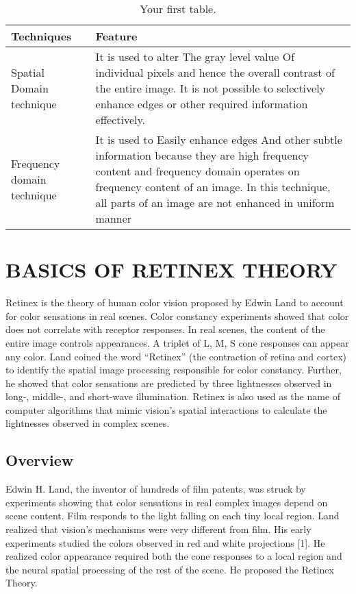 \begin{table}[h!]
	\begin{center}
	\caption{Your first table.}
    \label{tab:table1}
	\begin{tabular}{| m{5cm} | m{8cm}| }
	\hline
		\textbf{Techniques} & \textbf{Feature}\\
	\hline
		Spatial Domain technique & It is used to alter The gray level value Of individual pixels and hence the overall contrast of the entire image. It is not possible to selectively enhance edges or other required information effectively. \\
	\hline
		Frequency domain technique & It is used to Easily enhance edges And other subtle information because they are high frequency content and frequency domain operates on frequency content of an image. In this technique, all parts of  an  image  are  not enhanced in uniform manner \\ 
	
	\hline
	\end{tabular}
	\end{center}

\end{table}


\section{BASICS OF RETINEX THEORY}
Retinex is the theory of human color vision proposed by Edwin Land to account for color sensations in real scenes. Color constancy experiments showed that color does not correlate with receptor responses. In real scenes, the content of the entire image controls appearances. A triplet of L, M, S cone responses can appear any color. Land coined the word “Retinex” (the contraction of retina and cortex) to identify the spatial image processing responsible for color constancy. Further, he showed that color sensations are predicted by three lightnesses observed in long-, middle-, and short-wave illumination. Retinex is also used as the name of computer algorithms that mimic vision’s spatial interactions to calculate the lightnesses observed in complex scenes.

\subsection{Overview}
Edwin H. Land, the inventor of hundreds of film patents, was struck by experiments showing that color sensations in real complex images depend on scene content. Film responds to the light falling on each tiny local region. Land realized that vision’s mechanisms were very different from film. His early experiments studied the colors observed in red and white projections [1]. He realized color appearance required both the cone responses to a local region and the neural spatial processing of the rest of the scene. He proposed the Retinex Theory.

